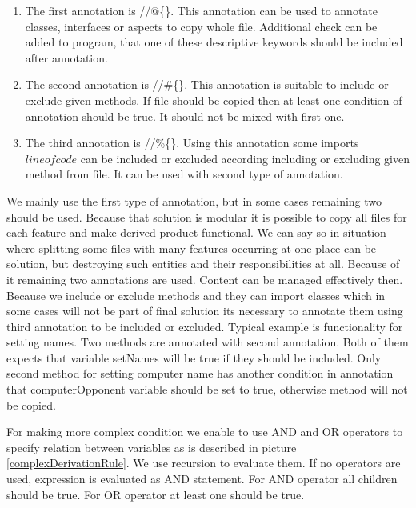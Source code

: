 \documentclass[11pt,slovak,a4paper,twoside]{article}
\begin{document}
\begin{enumerate}
	\item The first annotation is //@\{\}. This annotation can be used to annotate classes, interfaces or aspects to copy whole file. Additional check can be added to program, that one of these descriptive keywords should be included after annotation.

	\item The second annotation is //\#\{\}. This annotation is suitable to include or exclude given methods. If file should be copied then at least one condition of annotation should be true. It should not be mixed with first one. 

	\item The third annotation is //\%\{\}. Using this annotation some imports \(line of code\) can be included or excluded according including or excluding given method from file. It can be used with second type of annotation. 
\end{enumerate}


We mainly use the first type of annotation, but in some cases remaining two should be used. Because that solution is modular it is possible to copy all files for each feature and make derived product functional. We can say so in situation where splitting some files with many features occurring at one place can be solution, but destroying such entities and their responsibilities at all. Because of it remaining two annotations are used. Content can be managed effectively then. Because we include or exclude methods and they can import classes which in some cases will not be part of final solution its necessary to annotate them using third annotation to be included or excluded. Typical example is functionality for setting names. Two methods are annotated with second annotation. Both of them expects that variable setNames will be true if they should be included. Only second method for setting computer name has another condition in annotation that computerOpponent variable should be set to true, otherwise method will not be copied. 
 
For making more complex condition we enable to use AND and OR operators to specify relation between variables as is described in picture \ref{complexDerivationRule}. We use recursion to evaluate them. If no operators are used, expression is evaluated as AND statement. For AND operator all children should be true. For OR operator at least one should be true.
\end{document}

